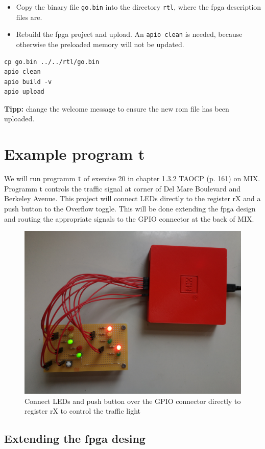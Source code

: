 \documentclass[a4paper,ngerman]{scrartcl}
\begin{document}
\begin{itemize}
	\item Copy the binary file \lstinline|go.bin| into the directory \lstinline|rtl|, where the fpga description files are.
	\item Rebuild the fpga project and upload. An \lstinline|apio clean| is needed, because otherwise the preloaded memory will not be updated.	
\end{itemize}

\begin{lstlisting}[numbers=none,frame=none]
cp go.bin ../../rtl/go.bin
apio clean
apio build -v
apio upload
\end{lstlisting}

\textbf{Tipp:} change the welcome message to ensure the new rom file has been uploaded.

\section{Example program t}
\label{traffic}
We will run programm \lstinline|t| of exercise 20 in chapter 1.3.2 TAOCP (p. 161) on MIX. Programm t controls the traffic signal at corner of Del Mare Boulevard and Berkeley Avenue. This project will connect LEDs directly to the register rX and a push button to the  Overflow toggle. This will be done extending the fpga design and routing the appropriate signals to the GPIO connector at the back of MIX.

\begin{figure}[H]
	\centering
	\includegraphics[width=0.7\linewidth]{../MIX_traffic}
	\caption{Connect LEDs and push button over the GPIO connector directly to register rX to control the traffic light}
	\label{fig:mixtraffic}
\end{figure}


\subsection{Extending the fpga desing}
\end{document}
